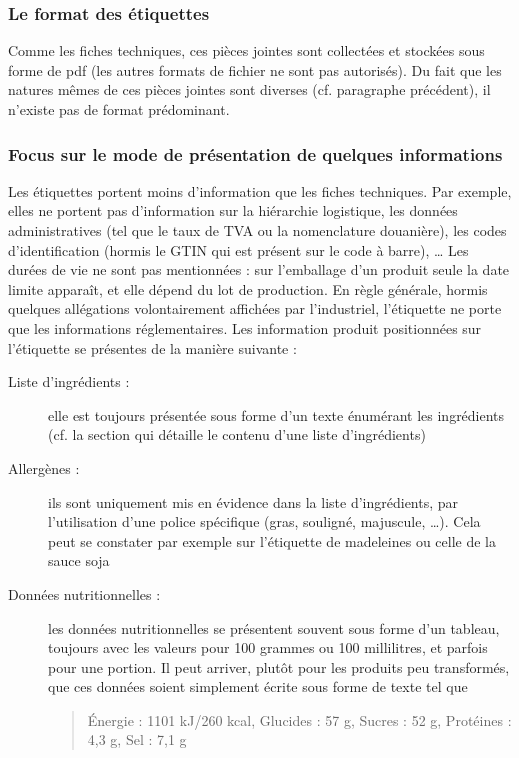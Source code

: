             \subsubsection{Le format des étiquettes}
            Comme les fiches techniques, ces pièces jointes sont collectées et stockées sous forme de pdf (les autres formats de fichier ne sont pas autorisés).
            Du fait que les natures mêmes de ces pièces jointes sont diverses (cf. paragraphe précédent), il n'existe pas de format prédominant.

            \subsubsection{Focus sur le mode de présentation de quelques informations}
            Les étiquettes portent moins d'information que les fiches techniques.
            Par exemple, elles ne portent pas d'information sur la hiérarchie logistique, les données administratives (tel que le taux de TVA ou la nomenclature douanière), les codes d'identification (hormis le GTIN qui est présent sur le code à barre), \dots
            Les durées de vie ne sont pas mentionnées : sur l'emballage d'un produit seule la date limite apparaît, et elle dépend du lot de production.
            En règle générale, hormis quelques allégations volontairement affichées par l'industriel, l'étiquette ne porte que les informations réglementaires.
            Les information produit positionnées sur l'étiquette se présentes de la manière suivante :
            \begin{description}
                \item[Liste d'ingrédients : ] elle est toujours présentée sous forme d'un texte énumérant les ingrédients (cf. la section  qui détaille le contenu d'une liste d'ingrédients)
                \item[Allergènes : ] ils sont uniquement mis en évidence dans la liste d'ingrédients, par l'utilisation d'une police spécifique (gras, souligné, majuscule, \dots). Cela peut se constater par exemple sur l'étiquette de madeleines  ou celle de la sauce soja 
                \item[Données nutritionnelles : ] les données nutritionnelles se présentent souvent sous forme d'un tableau, toujours avec les valeurs pour 100 grammes ou 100 millilitres, et parfois pour une portion.
                Il peut arriver, plutôt pour les produits peu transformés, que ces données soient simplement écrite sous forme de texte tel que \begin{quote}\'{E}nergie : 1101 kJ/260 kcal, Glucides : 57 g, Sucres : 52 g, Protéines : 4,3 g, Sel : 7,1 g\end{quote} 
            \end{description}           

